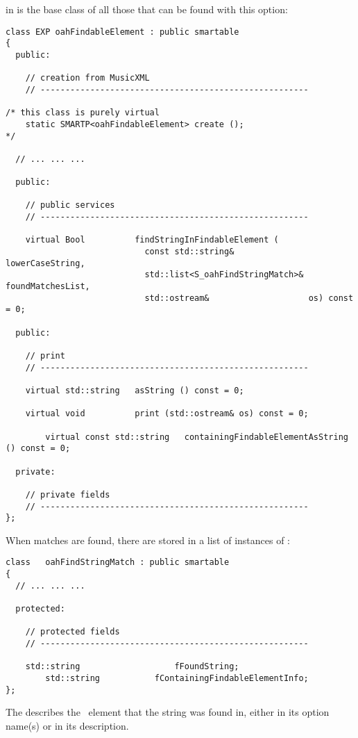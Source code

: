  in  is the base class   of all those that can be found with this  option:
\begin{lstlisting}[language=Terminal]
class EXP oahFindableElement : public smartable
{
  public:

    // creation from MusicXML
    // ------------------------------------------------------

/* this class is purely virtual
    static SMARTP<oahFindableElement> create ();
*/

  // ... ... ...

  public:

    // public services
    // ------------------------------------------------------

    virtual Bool          findStringInFindableElement (
                            const std::string&          lowerCaseString,
                            std::list<S_oahFindStringMatch>& foundMatchesList,
                            std::ostream&                    os) const = 0;

  public:

    // print
    // ------------------------------------------------------

    virtual std::string   asString () const = 0;

    virtual void          print (std::ostream& os) const = 0;

		virtual const std::string 	containingFindableElementAsString () const = 0;

  private:

    // private fields
    // ------------------------------------------------------
};
\end{lstlisting}

When matches are found, there are stored in a list of instances of :
\begin{lstlisting}[language=Terminal]
class   oahFindStringMatch : public smartable
{
  // ... ... ...

  protected:

    // protected fields
    // ------------------------------------------------------

    std::string			          fFoundString;
		std::string           fContainingFindableElementInfo;
};
\end{lstlisting}

The  describes the \oahRepr\ element that the string was found in, either in its option name(s) or in its description.

